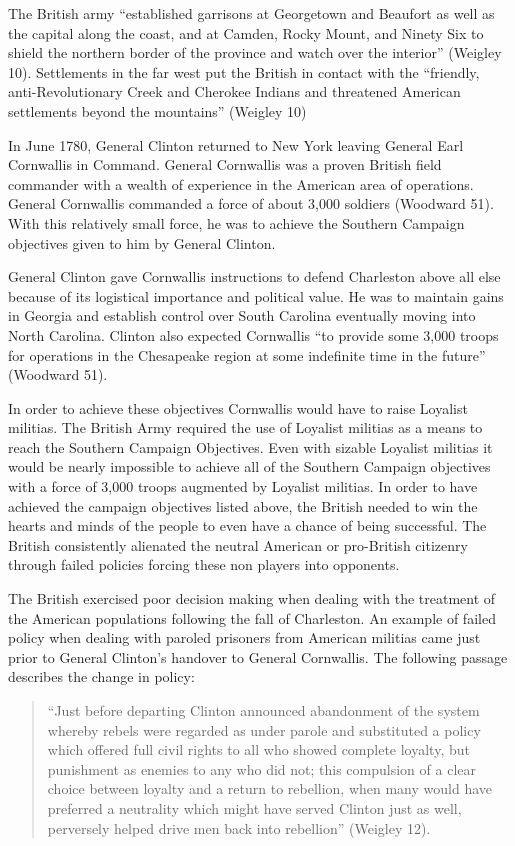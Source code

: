 The British army ``established garrisons at Georgetown and Beaufort as well as the capital along the coast, and at Camden, Rocky Mount, and Ninety Six to shield the northern border of the province and watch over the interior'' (Weigley 10).  Settlements in the far west put the British in contact with the ``friendly, anti-Revolutionary Creek and Cherokee Indians and threatened American settlements beyond the mountains'' (Weigley 10)

In June 1780, General Clinton returned to New York leaving General Earl Cornwallis in Command.  General Cornwallis was a proven British field commander with a wealth of experience in the American area of operations.  General Cornwallis commanded a force  of about 3,000 soldiers (Woodward 51).  With this relatively small force, he was to achieve the Southern Campaign objectives given to him by General Clinton.   

General Clinton gave Cornwallis instructions to defend Charleston above all else because of its logistical importance and political value.  He was to maintain gains in Georgia and establish control over South Carolina eventually moving into North Carolina.  Clinton also expected Cornwallis ``to provide some 3,000 troops for operations in the Chesapeake region at some indefinite time in the future'' (Woodward 51).  

In order to achieve these objectives Cornwallis would have to raise Loyalist militias.  The British Army required the use of Loyalist militias as a means to reach the Southern Campaign Objectives.  Even with sizable Loyalist militias it would be nearly impossible to achieve all of the Southern Campaign objectives with a force of 3,000 troops augmented by Loyalist militias.   In order to have achieved the campaign objectives listed above, the British needed to win the hearts and minds of the people to even have a chance of being successful.  The British consistently alienated the neutral American or pro-British citizenry through failed policies forcing these non players into opponents.

The British exercised poor decision making when dealing with the treatment of the American populations following the fall of Charleston.  An example of failed policy when dealing with paroled prisoners from American militias came just prior to General Clinton's handover to General Cornwallis.  The following passage describes the change in policy: 

\begin{quote}
``Just before departing Clinton announced abandonment of the system whereby rebels were regarded as under parole and substituted a policy which offered full civil rights to all who showed complete loyalty, but punishment as enemies to any who did not; this compulsion of a clear choice between loyalty and a return to rebellion, when many would have preferred a neutrality which might have served Clinton just as well, perversely helped drive men back into rebellion'' (Weigley 12). 
\end{quote}

